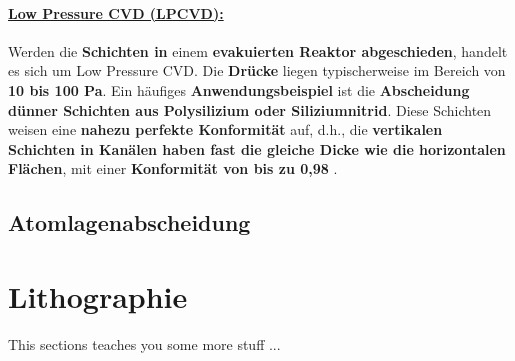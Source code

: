 \documentclass{article} %
\begin{document}
\vspace{0.0em}
\paragraph{\uline{Low Pressure CVD (LPCVD):}} Werden die \textbf{Schichten in} einem \textbf{evakuierten Reaktor abgeschieden}, handelt es sich um Low Pressure 
CVD. Die \textbf{Drücke} liegen typischerweise im Bereich von \textbf{10 bis 100 Pa}. Ein häufiges \textbf{Anwendungsbeispiel} ist die \textbf{Abscheidung dünner 
Schichten aus Polysilizium oder Siliziumnitrid}. Diese Schichten weisen eine \textbf{nahezu perfekte Konformität} auf, d.h., die \textbf{vertikalen Schichten in 
Kanälen haben fast die gleiche Dicke wie die horizontalen Flächen}, mit einer \textbf{Konformität von bis zu 0,98} \cite{keplinger2024CVD}.

\vspace{1em}
\subsection{Atomlagenabscheidung} %

\vspace{1em}
\section{Lithographie} %
This sections teaches you some more stuff ...

\thispagestyle{empty}
\newpage
\end{document}

